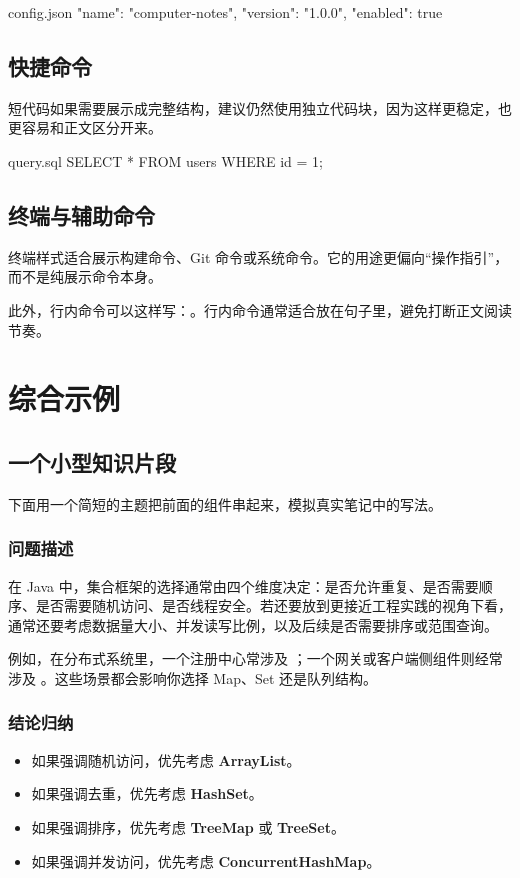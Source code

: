 \documentclass{computer-notes}
\begin{document}
\begin{codeblock}[JSON]{config.json}
{
  "name": "computer-notes",
  "version": "1.0.0",
  "enabled": true
}
\end{codeblock}

\section{快捷命令}
短代码如果需要展示成完整结构，建议仍然使用独立代码块，因为这样更稳定，也更容易和正文区分开来。

\begin{codeblock}[SQL]{query.sql}
SELECT *
FROM users
WHERE id = 1;
\end{codeblock}

\section{终端与辅助命令}
终端样式适合展示构建命令、Git 命令或系统命令。它的用途更偏向“操作指引”，而不是纯展示命令本身。



此外，行内命令可以这样写：。行内命令通常适合放在句子里，避免打断正文阅读节奏。

\chapter{综合示例}

\section{一个小型知识片段}
下面用一个简短的主题把前面的组件串起来，模拟真实笔记中的写法。

\subsection{问题描述}
在 Java 中，集合框架的选择通常由四个维度决定：是否允许重复、是否需要顺序、是否需要随机访问、是否线程安全。若还要放到更接近工程实践的视角下看，通常还要考虑数据量大小、并发读写比例，以及后续是否需要排序或范围查询。

例如，在分布式系统里，一个注册中心常涉及 ；一个网关或客户端侧组件则经常涉及 。这些场景都会影响你选择 Map、Set 还是队列结构。

\subsection{结论归纳}
\begin{itemize}
  \item 如果强调随机访问，优先考虑 \textbf{ArrayList}。
  \item 如果强调去重，优先考虑 \textbf{HashSet}。
  \item 如果强调排序，优先考虑 \textbf{TreeMap} 或 \textbf{TreeSet}。
  \item 如果强调并发访问，优先考虑 \textbf{ConcurrentHashMap}。
\end{itemize}
\end{document}
